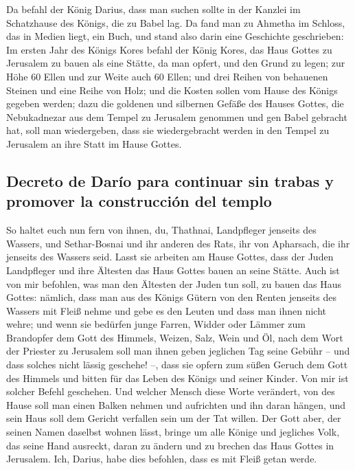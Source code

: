  Da befahl der König Darius, dass man suchen sollte in der
Kanzlei im Schatzhause des Königs, die zu Babel lag.  Da
fand man zu Ahmetha im Schloss, das in Medien liegt, ein Buch, und stand
also darin eine Geschichte geschrieben:  Im ersten Jahr
des Königs Kores befahl der König Kores, das Haus Gottes zu Jerusalem zu
bauen als eine Stätte, da man opfert, und den Grund zu legen; zur Höhe
60 Ellen und zur Weite auch 60 Ellen;  und drei Reihen von
behauenen Steinen und eine Reihe von Holz; und die Kosten sollen vom
Hause des Königs gegeben werden;  dazu die goldenen und
silbernen Gefäße des Hauses Gottes, die Nebukadnezar aus dem Tempel zu
Jerusalem genommen und gen Babel gebracht hat, soll man wiedergeben,
dass sie wiedergebracht werden in den Tempel zu Jerusalem an ihre Statt
im Hause Gottes.

\hypertarget{decreto-de-daruxedo-para-continuar-sin-trabas-y-promover-la-construcciuxf3n-del-templo}{%
\subsection{Decreto de Darío para continuar sin trabas y promover la
construcción del
templo}\label{decreto-de-daruxedo-para-continuar-sin-trabas-y-promover-la-construcciuxf3n-del-templo}}

 So haltet euch nun fern von ihnen, du, Thathnai,
Landpfleger jenseits des Wassers, und Sethar-Bosnai und ihr anderen des
Rats, ihr von Apharsach, die ihr jenseits des Wassers seid.
 Lasst sie arbeiten am Hause Gottes, dass der Juden
Landpfleger und ihre Ältesten das Haus Gottes bauen an seine Stätte.
 Auch ist von mir befohlen, was man den Ältesten der Juden
tun soll, zu bauen das Haus Gottes: nämlich, dass man aus des Königs
Gütern von den Renten jenseits des Wassers mit Fleiß nehme und gebe es
den Leuten und dass man ihnen nicht wehre;  und wenn sie
bedürfen junge Farren, Widder oder Lämmer zum Brandopfer dem Gott des
Himmels, Weizen, Salz, Wein und Öl, nach dem Wort der Priester zu
Jerusalem soll man ihnen geben jeglichen Tag seine Gebühr -- und dass
solches nicht lässig geschehe! --,  dass sie opfern zum
süßen Geruch dem Gott des Himmels und bitten für das Leben des Königs
und seiner Kinder.  Von mir ist solcher Befehl geschehen.
Und welcher Mensch diese Worte verändert, von des Hause soll man einen
Balken nehmen und aufrichten und ihn daran hängen, und sein Haus soll
dem Gericht verfallen sein um der Tat willen.  Der Gott
aber, der seinen Namen daselbst wohnen lässt, bringe um alle Könige und
jegliches Volk, das seine Hand ausreckt, daran zu ändern und zu brechen
das Haus Gottes in Jerusalem. Ich, Darius, habe dies befohlen, dass es
mit Fleiß getan werde.

